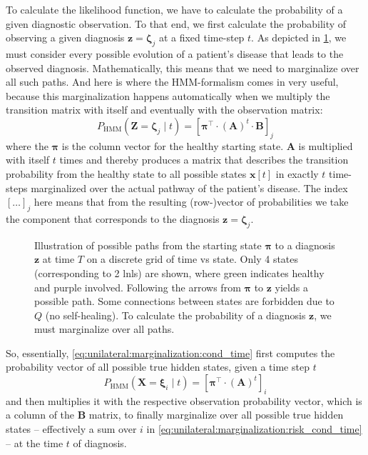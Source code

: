 \documentclass[\relativeRoot/main.tex]{subfiles}
\begin{document}
To calculate the likelihood function, we have to calculate the probability of a given diagnostic observation. To that end, we first calculate the probability of observing a given diagnosis $\mathbf{z} = \boldsymbol{\zeta}_j$ at a fixed time-step $t$. As depicted in \cref{fig:unilateral:hmm_paths}, we must consider every possible evolution of a patient's disease that leads to the observed diagnosis. Mathematically, this means that we need to marginalize over all such paths. And here is where the HMM-formalism comes in very useful, because this marginalization happens automatically when we multiply the transition matrix with itself and eventually with the observation matrix:
%
\begin{equation} \label{eq:unilateral:marginalization:cond_time}
    P_\text{HMM} \left( \mathbf{Z} = \boldsymbol{\zeta}_j \mid t \right) = \left[ \boldsymbol{\pi}^\top \cdot (\mathbf{A})^t \cdot \mathbf{B} \right]_j
\end{equation}
%
where the $\boldsymbol{\pi}$ is the column vector for the healthy starting state. $\mathbf{A}$ is multiplied with itself $t$ times and thereby produces a matrix that describes the transition probability from the healthy state to all possible states $\mathbf{x}[t]$ in exactly $t$ time-steps marginalized over the actual pathway of the patient's disease. The index $[\ldots]_j$ here means that from the resulting (row-)vector of probabilities we take the component that corresponds to the diagnosis $\mathbf{z} = \boldsymbol{\zeta}_j$.

\begin{figure}
    \centering
    \def\svgwidth{0.9\textwidth}
    
    \caption{Illustration of possible paths from the starting state $\boldsymbol{\pi}$ to a diagnosis $\mathbf{z}$ at time $T$ on a discrete grid of time vs state. Only 4 states (corresponding to 2 \glspl{lnl}) are shown, where green indicates healthy and purple involved. Following the arrows from $\boldsymbol{\pi}$ to $\mathbf{z}$ yields a possible path. Some connections between states are forbidden due to $Q$ (no self-healing). To calculate the probability of a diagnosis $\mathbf{z}$, we must marginalize over all paths.}
    \label{fig:unilateral:hmm_paths}
\end{figure}

So, essentially, \cref{eq:unilateral:marginalization:cond_time} first computes the probability vector of all possible true hidden states, given a time step $t$
%
\begin{equation} \label{eq:unilateral:marginalization:risk_cond_time}
    P_\text{HMM} \left( \mathbf{X} = \boldsymbol{\xi}_i \mid t \right) = \left[ \boldsymbol{\pi}^\top \cdot (\mathbf{A})^t \right]_i
\end{equation}
%
and then multiplies it with the respective observation probability vector, which is a column of the $\mathbf{B}$ matrix, to finally marginalize over all possible true hidden states -- effectively a sum over $i$ in \cref{eq:unilateral:marginalization:risk_cond_time} -- at the time $t$ of diagnosis.
\end{document}

